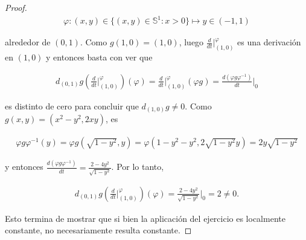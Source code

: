 \documentclass[11pt]{article}
\newcommand{\Ss}{\mathbb{S}}
\begin{document}
\begin{proof}
\begin{align*}
\varphi : (x,y) \in \{(x,y) \in \Ss^1 : x > 0\} \mapsto y \in (-1,1)
\end{align*}

alrededor de $(0,1)$. Como $g(1,0) = (1,0)$, luego $\frac{d}{dt}\Big|_{(1,0)}^\varphi$ es una derivaci\'on en $(1,0)$ y entonces basta con ver que

\begin{align*}
d_{(0,1)}g\left(\frac{d}{dt}\Big|_{(1,0)}^\varphi\right)(\varphi) = \frac{d}{dt}\Big|_{(1,0)}^\varphi(\varphi g) = \frac{d(\varphi g\varphi^{-1})}{dt}\Big|_0
\end{align*}

es distinto de cero para concluir que $d_{(1,0)}g \neq 0$. Como $g(x,y) = (x^2 -y^2,2xy)$, es

\begin{align*}
\varphi g\varphi^{-1}(y) = \varphi g(\sqrt{1-y^2},y) = \varphi(1-y^2-y^2,2\sqrt{1-y^2}y) = 2y\sqrt{1-y^2}
\end{align*}

y entonces $\frac{d(\varphi g\varphi^{-1})}{dt} = \frac{2-4y^2}{\sqrt{1-y^2}}$. Por lo tanto,

\begin{align*}
d_{(0,1)}g\left(\frac{d}{dt}\Big|_{(1,0)}^\varphi\right)(\varphi) =  \frac{2-4y^2}{\sqrt{1-y^2}}\Bigg|_0 = 2 \neq 0.
\end{align*}

Esto termina de mostrar que si bien la aplicaci\'on del ejercicio es localmente constante, no necesariamente resulta constante. 

\end{proof}
\end{document}
